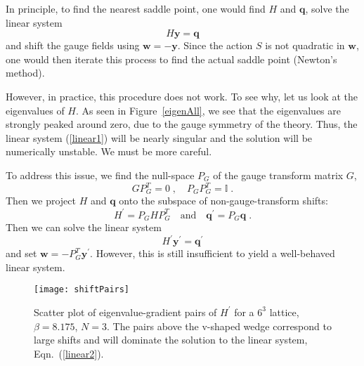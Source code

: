 \documentclass[preprint,aps,prd]{revtex4-2}
\newcommand{\be}{\begin{equation}}
\newcommand{\eq}{\end{equation}}
\begin{document}
In principle, to find the nearest saddle point, one would
find $H$ and $\mathbf{q}$, solve the linear system
\be
    H \mathbf{y} = \mathbf{q} \label{linear1}
\eq
and shift the gauge fields using $\mathbf{w} = -\mathbf{y}$.
Since the action $S$ is not quadratic in $\mathbf{w}$, one
would then iterate this process to find the actual saddle point
(Newton's method).

However, in practice, this procedure does not work.  To see why, let us
look at the eigenvalues of $H$.  As seen in Figure~\ref{eigenAll},
we see that the eigenvalues are strongly peaked around zero,
due to the gauge symmetry of the theory.  Thus, the linear
system (\ref{linear1}) will be nearly singular and
the solution will be numerically unstable.  We must be more careful.

To address this issue, we find the null-space $P_G$ of the gauge
transform matrix $G$,
\be
G P_G^T = 0 \; , \quad P_G P_G^T = \mathbb{I}\; .
\eq
Then we project $H$ and $\mathbf{q}$ onto
the subspace of non-gauge-transform shifts:
\be
         H^\prime = P_G H P_G^T \quad \mbox{and} \quad
         \mathbf{q}^\prime = P_G \mathbf{q} \; .
\eq
Then we can solve the linear system
\be
   H^\prime \mathbf{y}^\prime = \mathbf{q}^\prime \label{linear2}
\eq
and set $\mathbf{w} = - P_G^T \mathbf{y}^\prime$.  However, this is
still insufficient to yield a well-behaved linear system.

\begin{figure}
\texttt{[image: shiftPairs]}
\caption{Scatter plot of eigenvalue-gradient pairs of $H^\prime$
  for a $6^3$ lattice, $\beta = 8.175$, $N=3$.  The pairs above the
  v-shaped wedge correspond to large shifts and will dominate
  the solution to the linear system, Eqn.~(\ref{linear2}).
  \label{shiftPairs}}
\end{figure}
\end{document}
